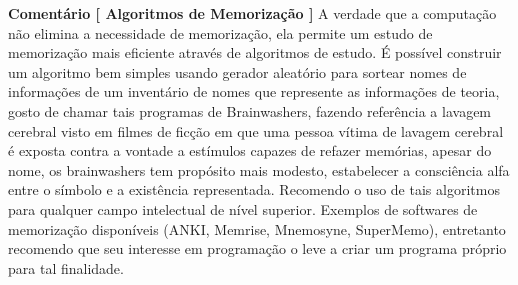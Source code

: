 \documentclass[10pt,a4paper]{report}
\begin{document}
\textbf{Comentário [ Algoritmos de Memorização ]} A verdade que a computação não elimina a necessidade de memorização, ela permite um estudo de memorização mais eficiente através de algoritmos de estudo. É possível construir um algoritmo bem simples usando gerador aleatório para sortear nomes de informações de um inventário de nomes que represente as informações de teoria, gosto de chamar tais programas de Brainwashers, fazendo referência a lavagem cerebral visto em filmes de ficção em que uma pessoa vítima de lavagem cerebral é exposta contra a vontade a estímulos capazes de refazer memórias, apesar do nome, os brainwashers tem propósito mais modesto, estabelecer a consciência alfa entre o símbolo e a existência representada. Recomendo o uso de tais algoritmos para qualquer campo intelectual de nível superior. Exemplos de softwares de memorização disponíveis (ANKI, Memrise, Mnemosyne, SuperMemo), entretanto recomendo que seu interesse em programação o leve a criar um programa próprio para tal finalidade.






\end{document}

